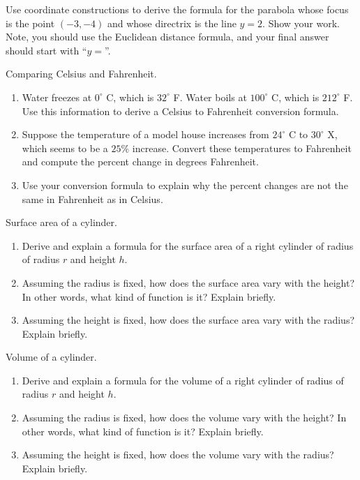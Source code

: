 \begin{prob}
Use coordinate constructions to derive the formula for the parabola
whose focus is the point $(-3,-4)$ and whose directrix is the line $y
= 2$. Show your work. Note, you should use the Euclidean distance
formula, and your final answer should start with ``$y = $''.  
\end{prob}

\begin{prob}
Comparing Celsius and Fahrenheit.  
\begin{enumerate}
\item Water freezes at $0^\circ$ C, which is $32^\circ$ F.  Water boils at $100^\circ$ C, which is $212^\circ$ F.  Use this information to derive a Celsius to Fahrenheit conversion formula.  
\item Suppose the temperature of a model house increases from $24^\circ$ C to $30^\circ$ X, which seems to be a $25\%$ increase.  Convert these temperatures to Fahrenheit and compute the percent change in degrees Fahrenheit. 
\item Use your conversion formula to explain why the percent changes are not the same in Fahrenheit as in Celsius.  
\end{enumerate}
\end{prob}


\begin{prob}
Surface area of a cylinder.
\begin{enumerate}
\item Derive and explain a formula for the surface area of a right cylinder of radius of radius $r$ and height $h$.  
\item Assuming the radius is fixed, how does the surface area vary with the height?  In other words, what kind of function is it?  Explain briefly.  
\item Assuming the height is fixed, how does the surface area vary with the radius?  Explain briefly. 
\end{enumerate}
\end{prob}

\begin{prob}
Volume of a cylinder.
\begin{enumerate}
\item Derive and explain a formula for the volume of a right cylinder of radius of radius $r$ and height $h$.  
\item Assuming the radius is fixed, how does the volume vary with the height?  In other words, what kind of function is it?  Explain briefly.  
\item Assuming the height is fixed, how does the volume vary with the radius?  Explain briefly. 
\end{enumerate}
\end{prob}


